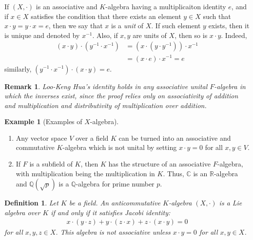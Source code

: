 \documentclass[11pt]{book}
\newtheorem{definition}{Definition}[section]
\newtheorem{remark}{Remark}[section]
\theoremstyle{definition}
\newtheorem{example}{Example}[section]
\numberwithin{equation}{chapter}
\begin{document}
If $(X,\cdot)$ is an associative and $K$-algebra having a multiplicaiton identity $e$, and if $x\in X$ satisfies the condition that there exists an element $y\in X$ such that $x\cdot y = y\cdot x = e$, then we say that $x$ is a \emph{unit} of $X$. If such element $y$ exists, then it is unique and denoted by $x^{-1}$. Also, if $x,y$ are units of $X$, then so is $x\cdot y$. Indeed,
\begin{align*}
    (x\cdot y)\cdot \left(y^{-1}\cdot x^{-1}\right) & = \left(x\cdot \left(y\cdot y^{-1}\right)\right)\cdot x^{-1} \\
    & = (x\cdot e)\cdot x^{-1} = e
\end{align*}
similarly, $\left(y^{-1}\cdot x^{-1}\right)\cdot(x\cdot y) = e$. 
\begin{remark}{\rm \cite{2}}
Loo-Keng Hua’s identity holds in any associative unital $F$-algebra in which the inverses exist, since the proof relies only on associativity of addition and multiplication and distributivity of multiplication over addition.
\end{remark}

\medskip

\begin{example}[Examples of $X$-algebra]
~\begin{enumerate}[label=(\arabic*)]
    \item Any vector space $V$ over a field $K$ can be turned into an associative and commutative $K$-algebra which is not unital by setting $x\cdot y = 0$ for all $x,y\in V$.
    \item If $F$ is a subfield of $K$, then $K$ has the structure of an associative $F$-algebra, with multiplication being the multiplication in $K$. Thus, $\mathbb{C}$ is an $\mathbb{R}$-algebra and $\mathbb{Q}(\sqrt{p})$ is a $\mathbb{Q}$-algebra for prime number $p$.
\end{enumerate}
\end{example}

\medskip

\begin{definition}
Let $K$ be a field. An anticommutative $K$-algebra $(X,\cdot)$ is a Lie algebra over $K$ if and only if it satisfies Jacobi identity:
\begin{align*}
    x\cdot (y\cdot z) + y\cdot (z\cdot x) + z\cdot (x\cdot y) = 0
\end{align*}
for all $x,y,z\in X$. This algebra is not associative unless $x\cdot y = 0$ for all $x,y\in X$.
\end{definition}
\end{document}
